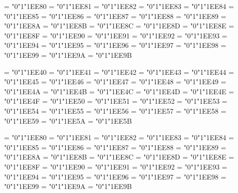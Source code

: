 \Umathchardef\loopedAlef = "0"1"1EE80
\Umathchardef\loopedBa = "0"1"1EE81
\Umathchardef\loopedJeem = "0"1"1EE82
\Umathchardef\loopedDal = "0"1"1EE83
\Umathchardef\loopedHa = "0"1"1EE84
\Umathchardef\loopedWaw = "0"1"1EE85
\Umathchardef\loopedZa = "0"1"1EE86
\Umathchardef\loopedHHa = "0"1"1EE87
\Umathchardef\loopedTTaa = "0"1"1EE88
\Umathchardef\loopedYa = "0"1"1EE89
\Umathchardef\loopedKaf = "0"1"1EE8A
\Umathchardef\loopedLam = "0"1"1EE8B
\Umathchardef\loopedMeem = "0"1"1EE8C
\Umathchardef\loopedNoon = "0"1"1EE8D
\Umathchardef\loopedSeen = "0"1"1EE8E
\Umathchardef\loopedAyn = "0"1"1EE8F
\Umathchardef\loopedFa = "0"1"1EE90
\Umathchardef\loopedSad = "0"1"1EE91
\Umathchardef\loopedQaf = "0"1"1EE92
\Umathchardef\loopedRa = "0"1"1EE93
\Umathchardef\loopedSheen = "0"1"1EE94
\Umathchardef\loopedTa = "0"1"1EE95
\Umathchardef\loopedTha = "0"1"1EE96
\Umathchardef\loopedKha = "0"1"1EE97
\Umathchardef\loopedDhal = "0"1"1EE98
\Umathchardef\loopedDad = "0"1"1EE99
\Umathchardef\loopedZzaa = "0"1"1EE9A
\Umathchardef\loopedGhain = "0"1"1EE9B

\Umathchardef{} = "0"1"1EE40
\Umathchardef{} = "0"1"1EE41
\Umathchardef{} = "0"1"1EE42
\Umathchardef{} = "0"1"1EE43
\Umathchardef{} = "0"1"1EE44
\Umathchardef{} = "0"1"1EE45
\Umathchardef{} = "0"1"1EE46
\Umathchardef{} = "0"1"1EE47
\Umathchardef{} = "0"1"1EE48
\Umathchardef{} = "0"1"1EE49
\Umathchardef{} = "0"1"1EE4A
\Umathchardef{} = "0"1"1EE4B
\Umathchardef{} = "0"1"1EE4C
\Umathchardef{} = "0"1"1EE4D
\Umathchardef{} = "0"1"1EE4E
\Umathchardef{} = "0"1"1EE4F
\Umathchardef{} = "0"1"1EE50
\Umathchardef{} = "0"1"1EE51
\Umathchardef{} = "0"1"1EE52
\Umathchardef{} = "0"1"1EE53
\Umathchardef{} = "0"1"1EE54
\Umathchardef{} = "0"1"1EE55
\Umathchardef{} = "0"1"1EE56
\Umathchardef{} = "0"1"1EE57
\Umathchardef{} = "0"1"1EE58
\Umathchardef{} = "0"1"1EE59
\Umathchardef{} = "0"1"1EE5A
\Umathchardef{} = "0"1"1EE5B


\Umathchardef{} = "0"1"1EE80
\Umathchardef{} = "0"1"1EE81
\Umathchardef{} = "0"1"1EE82
\Umathchardef{} = "0"1"1EE83
\Umathchardef{} = "0"1"1EE84
\Umathchardef{} = "0"1"1EE85
\Umathchardef{} = "0"1"1EE86
\Umathchardef{} = "0"1"1EE87
\Umathchardef{} = "0"1"1EE88
\Umathchardef{} = "0"1"1EE89
\Umathchardef{} = "0"1"1EE8A
\Umathchardef{} = "0"1"1EE8B
\Umathchardef{} = "0"1"1EE8C
\Umathchardef{} = "0"1"1EE8D
\Umathchardef{} = "0"1"1EE8E
\Umathchardef{} = "0"1"1EE8F
\Umathchardef{} = "0"1"1EE90
\Umathchardef{} = "0"1"1EE91
\Umathchardef{} = "0"1"1EE92
\Umathchardef{} = "0"1"1EE93
\Umathchardef{} = "0"1"1EE94
\Umathchardef{} = "0"1"1EE95
\Umathchardef{} = "0"1"1EE96
\Umathchardef{} = "0"1"1EE97
\Umathchardef{} = "0"1"1EE98
\Umathchardef{} = "0"1"1EE99
\Umathchardef{} = "0"1"1EE9A
\Umathchardef{} = "0"1"1EE9B


